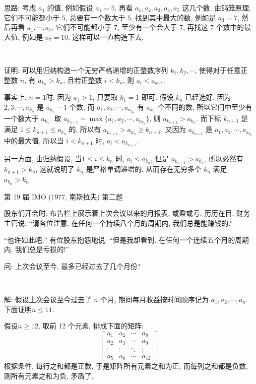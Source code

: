 思路: 考虑 $a_1$ 的值, 例如假设 $a_1 = 5$, 再看 $a_1, a_2, a_3, a_4, a_5$ 这几个数, 由鸽笼原理, 它们不可能都小于 $5$, 总要有一个数大于 $5$, 找到其中最大的数, 例如是 $a_3=7$, 然后再看 $a_1, \cdots, a_7$, 它们不可能都小于 $7$, 至少有一个会大于 $7$, 再找这 7 个数中的最大值, 例如是 $a_7 = 10$, 这样可以一直构造下去.

~

证明: 可以用归纳构造一个无穷严格递增的正整数序列 $k_1, k_2, \cdots$, 使得对于任意正整数 $n$, 有 $a_{k_n} > k_n$, 且若正整数 $i < k_n$, 则 $a_i < a_{k_n}$.

事实上, $n=1$时, 因为 $a_1 > 1$, 只要取 $k_1 = 1$ 即可. 假设 $k_n$ 已经选好, 因为 $2, 3, \cdots, a_{k_n}$ 是 $a_{k_n} - 1$ 个数, 而 $a_1, a_2, \cdots, a_{a_{k_n}}$ 有 $a_{k_n}$ 个不同的数, 所以它们中至少有一个数大于 $a_{k_n}$. 取 $a_{k_{n+1}} = \max\{a_1, a_2, \cdots, a_{a_{k_n}}\}$, 则 $a_{k_{n+1}} > a_{k_n}$. 而下标 $k_{n+1}$ 是满足 $1 \le k_{n+1} \le a_{k_n}$ 的, 所以有 $a_{k_{n+1}} > a_{k_n} \ge k_{n+1}$. 又因为 $a_{k_{n+1}}$ 是 $a_1, a_2, \cdots, a_{a_{k_n}}$ 中的最大值, 所以当 $i < k_{n+1}$ 时, $a_i < a_{k_{n+1}}$. 

另一方面, 由归纳假设, 当$1\le i \le k_n$ 时,  $a_i \le a_{k_n}$, 但是 $a_{k_{n+1}} > a_{k_n}$, 所以必然有 $k_{n+1} > k_n$, 这就说明了 $k_n$ 是严格单调递增的. 从而存在无穷多个 $k_n$ 满足 $a_{k_n} > k_n$.

\newpage
\noindent 第 19 届 IMO (1977, 南斯拉夫) 第二题

股东们开会时, 布告栏上展示着上次会议以来的月报表, 或盈或亏, 历历在目. 财务主管说: ``请各位注意, 在任何一个持续八个月的周期内, 我们总是能赚钱的.''

``也许如此吧,'' 有位股东抱怨地说: ``但是我却看到, 在任何一个连续五个月的周期内, 我们总是亏损的!''

问: 上次会议至今, 最多已经过去了几个月份?

~

解: 假设上次会议至今过去了 $n$ 个月, 期间每月收益按时间顺序记为 $a_1, a_2, \cdots, a_n$. 下面证明$n \le 11$.

假设$n\ge 12$, 取前 12 个元素, 排成下面的矩阵:
\[
\begin{bmatrix}
a_1 & a_2 & \cdots & a_8 \\
a_2 & a_3 & \cdots & a_9 \\
\vdots & \vdots & \ddots & \vdots \\
a_5 & a_6 & \cdots & a_{12}
\end{bmatrix}
\]
根据条件, 每行之和都是正数, 于是矩阵所有元素之和为正; 而每列之和都是负数, 则所有元素之和为负, 矛盾了.


